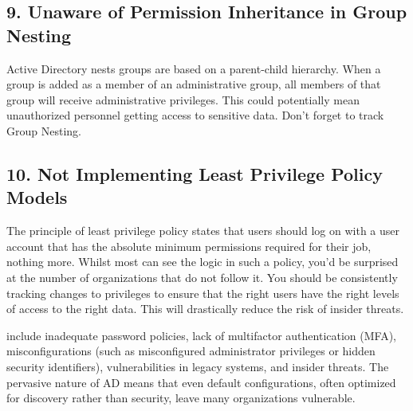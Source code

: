 \subsection{9. Unaware of Permission Inheritance in Group Nesting}
Active Directory nests groups are based on a parent-child hierarchy. When a group is added as a member of an administrative group, all members of that group will receive administrative privileges. This could potentially mean unauthorized personnel getting access to sensitive data. Don’t forget to track Group Nesting.

\subsection{10. Not Implementing Least Privilege Policy Models}
The principle of least privilege policy states that users should log on with a user account that has the absolute minimum permissions required for their job, nothing more. Whilst most can see the logic in such a policy, you’d be surprised at the number of organizations that do not follow it. You should be consistently tracking changes to privileges to ensure that the right users have the right levels of access to the right data. This will drastically reduce the risk of insider threats.

 
 

include inadequate password policies, lack of multifactor authentication (MFA), misconfigurations (such as misconfigured administrator privileges or hidden security identifiers), vulnerabilities in legacy systems, and insider threats. The pervasive nature of AD means that even default configurations, often optimized for discovery rather than security, leave many organizations vulnerable.

